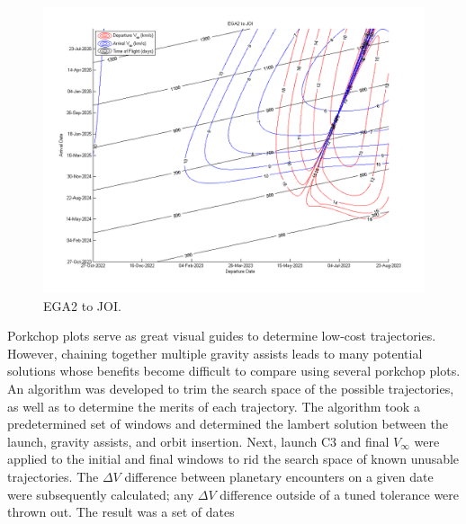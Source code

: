 \documentclass[]{aiaa-tc}%
\begin{document}
	\begin{figure}[H]
		\centering
			\includegraphics[width = 18cm]{../PCP/VEEJ/3_EGA2_JOI.png}
		\caption{EGA2 to JOI. }
		\label{fig:PCP_EGA2_JOI}
	\end{figure}	

	Porkchop plots serve as great visual guides to determine low-cost trajectories. However, chaining together multiple gravity assists leads to many potential solutions whose benefits become difficult to compare using several porkchop plots. An algorithm was developed to trim the search space of the possible trajectories, as well as to determine the merits of each trajectory. The algorithm took a predetermined set of windows and determined the lambert solution between the launch, gravity assists, and orbit insertion. Next, launch C3 and final $V_\infty$ were applied to the initial and final windows to rid the search space of known unusable trajectories. The ${\Delta}V$ difference between planetary encounters on a given date were subsequently calculated; any ${\Delta}V$ difference outside of a tuned tolerance were thrown out. The result was a set of dates
	
	\vspace{5 mm}
\end{document}
